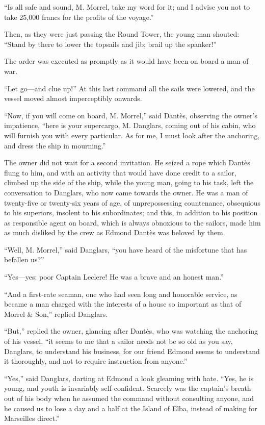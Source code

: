 “Is all safe and sound, M. Morrel, take my word for it; and I advise
you not to take 25,000 francs for the profits of the voyage.”

Then, as they were just passing the Round Tower, the young man shouted:
“Stand by there to lower the topsails and jib; brail up the spanker!”

The order was executed as promptly as it would have been on board a
man-of-war.

“Let go—and clue up!” At this last command all the sails were lowered,
and the vessel moved almost imperceptibly onwards.

“Now, if you will come on board, M. Morrel,” said Dantès, observing the
owner’s impatience, “here is your supercargo, M. Danglars, coming out
of his cabin, who will furnish you with every particular. As for me, I
must look after the anchoring, and dress the ship in mourning.”

The owner did not wait for a second invitation. He seized a rope which
Dantès flung to him, and with an activity that would have done credit
to a sailor, climbed up the side of the ship, while the young man,
going to his task, left the conversation to Danglars, who now came
towards the owner. He was a man of twenty-five or twenty-six years of
age, of unprepossessing countenance, obsequious to his superiors,
insolent to his subordinates; and this, in addition to his position as
responsible agent on board, which is always obnoxious to the sailors,
made him as much disliked by the crew as Edmond Dantès was beloved by
them.

“Well, M. Morrel,” said Danglars, “you have heard of the misfortune
that has befallen us?”

“Yes—yes: poor Captain Leclere! He was a brave and an honest man.”

“And a first-rate seaman, one who had seen long and honorable service,
as became a man charged with the interests of a house so important as
that of Morrel \& Son,” replied Danglars.

“But,” replied the owner, glancing after Dantès, who was watching the
anchoring of his vessel, “it seems to me that a sailor needs not be so
old as you say, Danglars, to understand his business, for our friend
Edmond seems to understand it thoroughly, and not to require
instruction from anyone.”

“Yes,” said Danglars, darting at Edmond a look gleaming with hate.
“Yes, he is young, and youth is invariably self-confident. Scarcely was
the captain’s breath out of his body when he assumed the command
without consulting anyone, and he caused us to lose a day and a half at
the Island of Elba, instead of making for Marseilles direct.”

